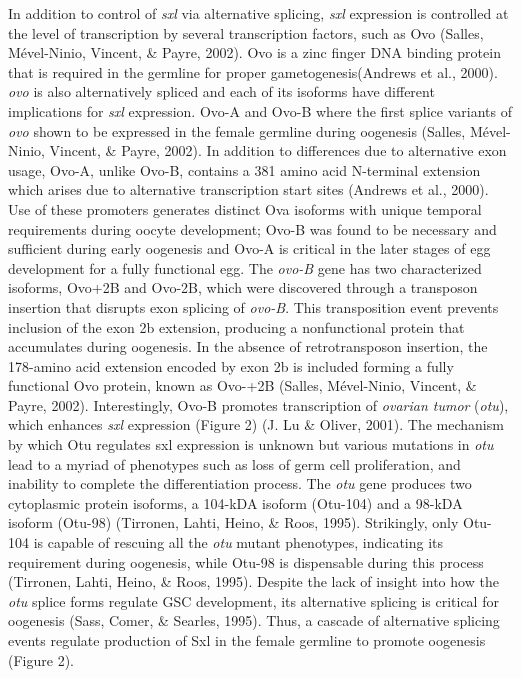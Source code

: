 \documentclass[12pt,oneside]{reedthesis}
\begin{document}
In addition to control of \emph{sxl} via alternative splicing, \emph{sxl}
expression is controlled at the level of transcription by several
transcription factors, such as Ovo (Salles, Mével-Ninio, Vincent, \& Payre, 2002). Ovo is a zinc
finger DNA binding protein that is required in the germline for proper
gametogenesis(Andrews et al., 2000). \emph{ovo} is also alternatively spliced and
each of its isoforms have different implications for \emph{sxl} expression.
Ovo-A and Ovo-B where the first splice variants of \emph{ovo} shown to be
expressed in the female germline during oogenesis (Salles, Mével-Ninio, Vincent, \& Payre, 2002). In
addition to differences due to alternative exon usage, Ovo-A, unlike
Ovo-B, contains a 381 amino acid N-terminal extension which arises due
to alternative transcription start sites (Andrews et al., 2000). Use of
these promoters generates distinct Ova isoforms with unique temporal
requirements during oocyte development; Ovo-B was found to be necessary
and sufficient during early oogenesis and Ovo-A is critical in the later
stages of egg development for a fully functional egg. The \emph{ovo-B} gene
has two characterized isoforms, Ovo+2B and Ovo-2B, which were discovered
through a transposon insertion that disrupts exon splicing of \emph{ovo-B}.
This transposition event prevents inclusion of the exon 2b extension,
producing a nonfunctional protein that accumulates during oogenesis. In
the absence of retrotransposon insertion, the 178-amino acid extension
encoded by exon 2b is included forming a fully functional Ovo protein,
known as Ovo-+2B (Salles, Mével-Ninio, Vincent, \& Payre, 2002). Interestingly, Ovo-B promotes
transcription of \emph{ovarian tumor} (\emph{otu}), which enhances \emph{sxl}
expression (Figure 2) (J. Lu \& Oliver, 2001). The mechanism by which Otu regulates
sxl expression is unknown but various mutations in \emph{otu} lead to a
myriad of phenotypes such as loss of germ cell proliferation, and
inability to complete the differentiation process. The \emph{otu} gene
produces two cytoplasmic protein isoforms, a 104-kDA isoform (Otu-104)
and a 98-kDA isoform (Otu-98) (Tirronen, Lahti, Heino, \& Roos, 1995). Strikingly, only
Otu-104 is capable of rescuing all the \emph{otu} mutant phenotypes,
indicating its requirement during oogenesis, while Otu-98 is dispensable
during this process (Tirronen, Lahti, Heino, \& Roos, 1995). Despite the lack of insight into
how the \emph{otu} splice forms regulate GSC development, its alternative
splicing is critical for oogenesis (Sass, Comer, \& Searles, 1995). Thus, a cascade of
alternative splicing events regulate production of Sxl in the female
germline to promote oogenesis (Figure 2).
\end{document}
